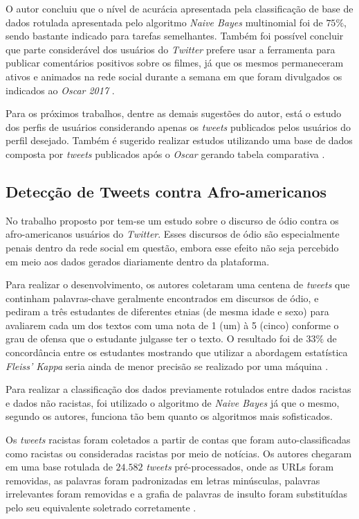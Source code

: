 O autor concluiu que o nível de acurácia apresentada pela classificação de base de dados rotulada apresentada pelo algoritmo \textit{Naive Bayes} multinomial foi de $75\%$, sendo bastante indicado para tarefas semelhantes. Também foi possível concluir que parte considerável dos usuários do \textit{Twitter} prefere usar a ferramenta para publicar comentários positivos sobre os filmes, já que os mesmos permaneceram ativos e animados na rede social durante a semana em que foram divulgados os indicados ao \textit{Oscar 2017} \cite{Correa2017}.

Para os próximos trabalhos, dentre as demais sugestões do autor, está o estudo dos perfis de usuários considerando apenas os \textit{tweets} publicados pelos usuários do perfil desejado. Também é sugerido realizar estudos utilizando uma base de dados composta por \textit{tweets} publicados após o \textit{Oscar} gerando tabela comparativa \cite{Correa2017}.

\subsection{Detecção de Tweets contra Afro-americanos}

No trabalho proposto por  tem-se um estudo sobre o discurso de ódio contra os afro-americanos usuários do \textit{Twitter}. Esses discursos de ódio são especialmente penais dentro da rede social em questão, embora esse efeito não seja percebido em meio aos dados gerados diariamente dentro da plataforma.

Para realizar o desenvolvimento, os autores coletaram uma centena de \textit{tweets} que continham palavras-chave geralmente encontrados em discursos de ódio, e pediram a três estudantes de diferentes etnias (de mesma idade e sexo) para avaliarem cada um dos textos com uma nota de 1 (um) à 5 (cinco) conforme o grau de ofensa que o estudante julgasse ter o texto. O resultado foi de $33\%$ de concordância entre os estudantes mostrando que utilizar a abordagem estatística \textit{Fleiss' Kappa} seria ainda de menor precisão se realizado por uma máquina \cite{kwok2013locate}.

Para realizar a classificação dos dados previamente rotulados entre dados racistas e dados não racistas, foi utilizado o algoritmo de \textit{Naive Bayes} já que o mesmo, segundo os autores, funciona tão bem quanto os algoritmos mais sofisticados.

Os \textit{tweets} racistas foram coletados a partir de contas que foram auto-classificadas como racistas ou consideradas racistas por meio de notícias. Os autores chegaram em uma base rotulada de $24.582$ \textit{tweets} pré-processados, onde as URLs foram removidas, as palavras foram padronizadas em letras minúsculas, palavras irrelevantes foram removidas e a grafia de palavras de insulto foram substituídas pelo seu equivalente soletrado corretamente \cite{kwok2013locate}.

